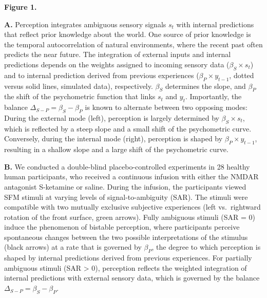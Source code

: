 \documentclass[
]{article}
\begin{document}
\textbf{Figure 1.}

\textbf{A.} Perception integrates ambiguous sensory signals \(s_t\) with
internal predictions that reflect prior knowledge about the world. One
source of prior knowledge is the temporal autocorrelation of natural
environments, where the recent past often predicts the near future. The
integration of external inputs and internal predictions depends on the
weights assigned to incoming sensory data (\(\beta_S \times s_t\)) and
to internal prediction derived from previous experiences
(\(\beta_P \times y_{t-1}\), dotted versus solid lines, simulated data),
respectively. \(\beta_S\) determines the slope, and \(\beta_P\) the
shift of the psychometric function that links \(s_t\) and \(y_t\).
Importantly, the balance \(\Delta_{S-P} = \beta_S - \beta_P\) is known
to alternate between two opposing modes: During the external mode
(left), perception is largely determined by \(\beta_S \times s_t\),
which is reflected by a steep slope and a small shift of the
psychometric curve. Conversely, during the internal mode (right),
perception is shaped by \(\beta_P \times y_{t-1}\), resulting in a
shallow slope and a large shift of the psychometric curve.

\textbf{B.} We conducted a double-blind placebo-controlled experiments
in 28 healthy human participants, who received a continuous infusion
with either the NMDAR antagonist S-ketamine or saline. During the
infusion, the participants viewed SFM stimuli at varying levels of
signal-to-ambiguity (SAR). The stimuli were compatible with two mutually
exclusive subjective experiences (left vs.~rightward rotation of the
front surface, green arrows). Fully ambiguous stimuli (SAR = 0) induce
the phenomenon of bistable perception, where participants perceive
spontaneous changes between the two possible interpretations of the
stimulus (black arrows) at a rate that is governed by \(\beta_P\), the
degree to which perception is shaped by internal predictions derived
from previous experiences. For partially ambiguous stimuli (SAR
\textgreater{} 0), perception reflects the weighted integration of
internal predictions with external sensory data, which is governed by
the balance \(\Delta_{S-P} = \beta_S - \beta_P\).
\end{document}
